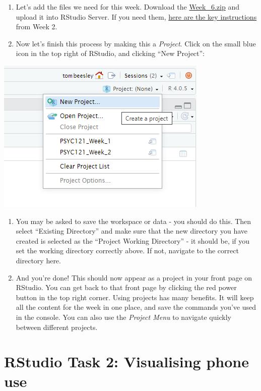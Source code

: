 \documentclass[
]{book}
\begin{document}
\begin{enumerate}
\def\labelenumi{\arabic{enumi}.}
\setcounter{enumi}{3}
\item
  Let's add the files we need for this week. Download the \href{files/Week_6/Week_6.zip}{Week\_6.zip} and upload it into RStudio Server. If you need them, \protect\hyperlink{uploading_zip}{here are the key instructions} from Week 2.
\item
  Now let's finish this process by making this a \emph{Project}. Click on the small blue icon in the top right of RStudio, and clicking ``New Project'':
\end{enumerate}

\includegraphics{files/Week_6/new_project.png}

\begin{enumerate}
\def\labelenumi{\arabic{enumi}.}
\setcounter{enumi}{5}
\item
  You may be asked to save the workspace or data - you should do this. Then select ``Existing Directory'' and make sure that the new directory you have created is selected as the ``Project Working Directory'' - it should be, if you set the working directory correctly above. If not, navigate to the correct directory here.
\item
  And you're done! This should now appear as a project in your front page on RStudio. You can get back to that front page by clicking the red power button in the top right corner. Using projects has many benefits. It will keep all the content for the week in one place, and save the commands you've used in the console. You can also use the \emph{Project Menu} to navigate quickly between different projects.
\end{enumerate}

\hypertarget{rstudio-task-2-visualising-phone-use}{%
\section{RStudio Task 2: Visualising phone use}\label{rstudio-task-2-visualising-phone-use}}
\end{document}
